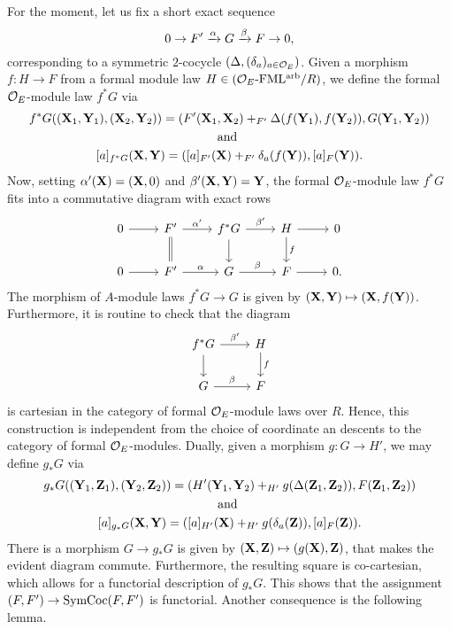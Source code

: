 \documentclass[../main.tex]{subfiles}
\begin{document}
For the moment, let us fix a short exact sequence
\begin{equation*}
0 \to F' \xrightarrow{\alpha} G \xrightarrow{\beta} F \to 0,
\end{equation*}
corresponding to a symmetric $2$-cocycle $(\Delta, (\delta_a)_{a \in \mathcal{O}_E})$. 
Given a morphism $f \colon H \to F$ from a formal module law $H \in {({\mathcal{O}_E}\textnormal-\allowbreak\mathrm{FML^{arb}}/{R})}$, we define the formal $\mathcal{O}_E$-module law $f^*G$ via 
\begin{gather*}
    f^*G((\mathbf{X}_1, \mathbf{Y}_1), (\mathbf{X}_2, \mathbf{Y}_2)) = (F'(\mathbf{X}_1, \mathbf{X}_2) +_{F'}
    \Delta(f(\mathbf{Y}_1), f(\mathbf{Y}_2)) , G(\mathbf{Y}_1, \mathbf{Y}_2)) \\
    \text{and } \\
    [a]_{f^*G}(\mathbf{X}, \mathbf{Y}) = ([a]_{F'}(\mathbf{X}) +_{F'} \delta_a(f(\mathbf{Y})), [a]_F(\mathbf{Y})).
\end{gather*}
Now, setting $\alpha'(\mathbf{X}) = (\mathbf{X}, 0)$ and $\beta'(\mathbf{X}, \mathbf{Y}) = \mathbf{Y}$, the formal
$\mathcal{O}_E$-module law $f^* G$ fits into a commutative diagram with exact rows
\begin{equation*}
\begin{tikzcd}[ampersand replacement=\&]
	0 \& {F'} \& {f^* G} \& H \& 0 \\
	0 \& {F'} \& G \& F \& 0.
	\arrow[from=1-1, to=1-2]
	\arrow["{\alpha'}", from=1-2, to=1-3]
	\arrow[Rightarrow, no head, from=1-2, to=2-2]
	\arrow["{\beta'}", from=1-3, to=1-4]
	\arrow[from=1-3, to=2-3]
	\arrow[from=1-4, to=1-5]
	\arrow["f", from=1-4, to=2-4]
	\arrow[from=2-1, to=2-2]
	\arrow["\alpha", from=2-2, to=2-3]
	\arrow["\beta", from=2-3, to=2-4]
	\arrow[from=2-4, to=2-5]
\end{tikzcd}
\end{equation*}
The morphism of $A$-module laws $f^*G \to G$ is given by $(\mathbf{X}, \mathbf{Y})\mapsto
(\mathbf{X},f(\mathbf{Y}))$. Furthermore, it is routine to check that the diagram
\begin{equation*}
    \begin{tikzcd}[ampersand replacement=\&]
    	{f^*G} \& H \\
    	G \& F
    	\arrow["{\beta'}", from=1-1, to=1-2]
    	\arrow[from=1-1, to=2-1]
    	\arrow["f", from=1-2, to=2-2]
    	\arrow["\beta", from=2-1, to=2-2]
    \end{tikzcd}
  \end{equation*}
is cartesian in the category of formal $\mathcal{O}_E$-module laws over $R$. Hence,
this construction is independent from the choice of coordinate an descents to 
the category of formal $\mathcal{O}_E$-modules. 
Dually, given a morphism $g\colon G \to H'$, we may 
define $g_* G$ via 
\begin{gather*}
  g_*G((\mathbf{Y}_1, \mathbf{Z}_1), (\mathbf{Y}_2, \mathbf{Z}_2)) = (H'(\mathbf{Y}_1, \mathbf{Y}_2) +_{H'}
  g(\Delta(\mathbf{Z}_1, \mathbf{Z}_2)) , F(\mathbf{Z}_1, \mathbf{Z}_2)) \\
  \text{and } \\
  [a]_{g_*G}(\mathbf{X}, \mathbf{Y}) = ([a]_{H'}(\mathbf{X}) +_{H'} g(\delta_a(\mathbf{Z})), [a]_F(\mathbf{Z})).
\end{gather*}
There is a morphism $G \to g_*G$ is given by $(\mathbf{X}, \mathbf{Z}) \mapsto (g(\mathbf{X}), \mathbf{Z})$,
that makes the evident diagram commute. Furthermore, the resulting square is 
co-cartesian, which allows for a functorial description of $g_* G$.
This shows that the assignment $(F,F') \to \operatorname{SymCoc}(F, F')$ is functorial.
Another consequence is the following lemma.
\end{document}
